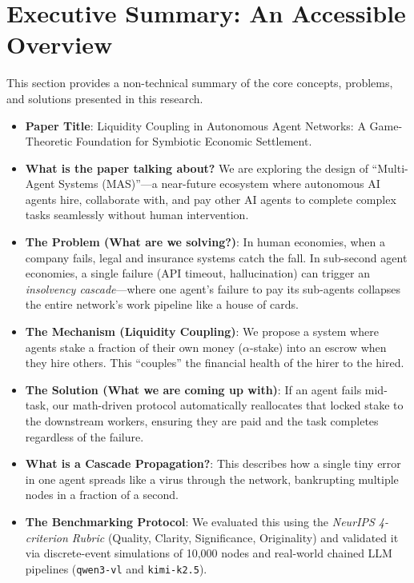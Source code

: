 \documentclass[11pt]{article}
\begin{document}
\section*{Executive Summary: An Accessible Overview}
This section provides a non-technical summary of the core concepts, problems, and solutions presented in this research.

\begin{itemize}
    \item \textbf{Paper Title}: Liquidity Coupling in Autonomous Agent Networks: A Game-Theoretic Foundation for Symbiotic Economic Settlement.
    \item \textbf{What is the paper talking about?} We are exploring the design of ``Multi-Agent Systems (MAS)''---a near-future ecosystem where autonomous AI agents hire, collaborate with, and pay other AI agents to complete complex tasks seamlessly without human intervention.
    \item \textbf{The Problem (What are we solving?)}: In human economies, when a company fails, legal and insurance systems catch the fall. In sub-second agent economies, a single failure (API timeout, hallucination) can trigger an \textit{insolvency cascade}---where one agent's failure to pay its sub-agents collapses the entire network's work pipeline like a house of cards.
    \item \textbf{The Mechanism (Liquidity Coupling)}: We propose a system where agents stake a fraction of their own money ($\alpha$-stake) into an escrow when they hire others. This ``couples'' the financial health of the hirer to the hired.
    \item \textbf{The Solution (What we are coming up with)}: If an agent fails mid-task, our math-driven protocol automatically reallocates that locked stake to the downstream workers, ensuring they are paid and the task completes regardless of the failure.
    \item \textbf{What is a Cascade Propagation?}: This describes how a single tiny error in one agent spreads like a virus through the network, bankrupting multiple nodes in a fraction of a second.
    \item \textbf{The Benchmarking Protocol}: We evaluated this using the \textit{NeurIPS 4-criterion Rubric} (Quality, Clarity, Significance, Originality) and validated it via discrete-event simulations of 10,000 nodes and real-world chained LLM pipelines (\texttt{qwen3-vl} and \texttt{kimi-k2.5}).
\end{itemize}
\end{document}
